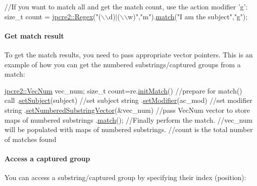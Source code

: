 \begin{DoxyCode}
\textcolor{comment}{//If you want to match all and get the match count, use the action modifier 'g':}
\textcolor{keywordtype}{size\_t} count = \hyperlink{classjpcre2_1_1Regex}{jpcre2::Regex}(\textcolor{stringliteral}{"(\(\backslash\)\(\backslash\)d)|(\(\backslash\)\(\backslash\)w)"},\textcolor{stringliteral}{"m"}).\hyperlink{classjpcre2_1_1Regex_ab93775a93a0a537d09b9e9ab4a5a3894_ab93775a93a0a537d09b9e9ab4a5a3894}{match}(\textcolor{stringliteral}{"I am the subject"},\textcolor{stringliteral}{"g"});
\end{DoxyCode}
\hypertarget{index_do-match}{}\paragraph{Get match result}\label{index_do-match}
To get the match results, you need to pass appropriate vector pointers. This is an example of how you can get the numbered substrings/captured groups from a match\+:


\begin{DoxyCode}
\hyperlink{namespacejpcre2_ac1cf752c8fbb0be78020be3b80e77ce3}{jpcre2::VecNum} vec\_num;
\textcolor{keywordtype}{size\_t} count=re.\hyperlink{classjpcre2_1_1Regex_a519b0915bf1163c6ce6a4d674b30cfcd_a519b0915bf1163c6ce6a4d674b30cfcd}{initMatch}()                                 \textcolor{comment}{//prepare for match() call}
               .\hyperlink{classjpcre2_1_1RegexMatch_a635c652195deaa8ebb9e107c4f972aab_a635c652195deaa8ebb9e107c4f972aab}{setSubject}(subject)                         \textcolor{comment}{//set subject string}
               .\hyperlink{classjpcre2_1_1RegexMatch_a9df7e92f96b61553f62720cb8f5f23e5_a9df7e92f96b61553f62720cb8f5f23e5}{setModifier}(ac\_mod)                         \textcolor{comment}{//set modifier string}
               .\hyperlink{classjpcre2_1_1RegexMatch_a2c7efe1ec2e13827f670db4ecedcd0a0_a2c7efe1ec2e13827f670db4ecedcd0a0}{setNumberedSubstringVector}(&vec\_num)        \textcolor{comment}{//pass VecNum vector
       to store maps of numbered substrings}
               .\hyperlink{classjpcre2_1_1RegexMatch_a5868aef3a146594ea1ebef34d122bb33_a5868aef3a146594ea1ebef34d122bb33}{match}();                                    \textcolor{comment}{//Finally perform the match.}
\textcolor{comment}{//vec\_num will be populated with maps of numbered substrings.}
\textcolor{comment}{//count is the total number of matches found}
\end{DoxyCode}
 \hypertarget{index_access-a-capture-group}{}\paragraph{Access a captured group}\label{index_access-a-capture-group}
You can access a substring/captured group by specifying their index (position)\+:


